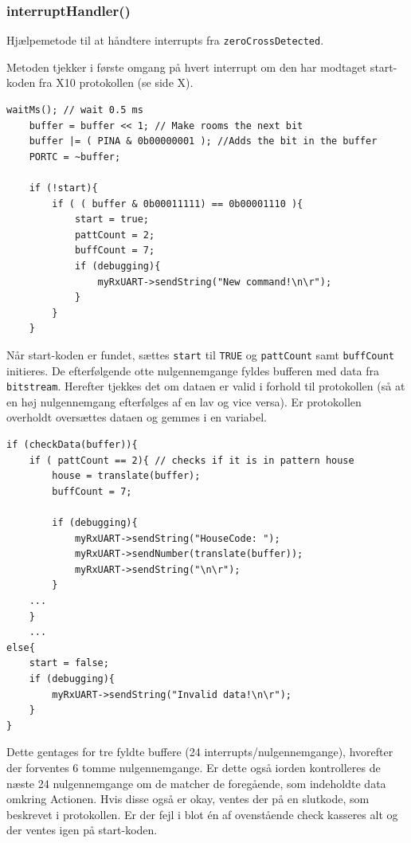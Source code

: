 \subsubsection{interruptHandler()}

Hjælpemetode til at håndtere interrupts fra \texttt{zeroCrossDetected}.

Metoden tjekker i første omgang på hvert interrupt om den har modtaget start-koden fra X10 protokollen (se side X). %

\begin{lstlisting}[caption=Der ventes 0.5 ms og der tjekkes efter startbit.]
	waitMs(); // wait 0.5 ms
	buffer = buffer << 1; // Make rooms the next bit
	buffer |= ( PINA & 0b00000001 ); //Adds the bit in the buffer
	PORTC = ~buffer;

	if (!start){
		if ( ( buffer & 0b00011111) == 0b00001110 ){
			start = true;
			pattCount = 2;
			buffCount = 7;
			if (debugging){
				myRxUART->sendString("New command!\n\r");
			}
		}
	}
\end{lstlisting}

Når start-koden er fundet, sættes \texttt{start} til \texttt{TRUE} og \texttt{pattCount} samt \texttt{buffCount} initieres. 
De efterfølgende otte nulgennemgange fyldes bufferen med data fra \texttt{bitstream}.
Herefter tjekkes det om dataen er valid i forhold til protokollen (så at en høj nulgennemgang efterfølges af en lav og vice versa).
Er protokollen overholdt oversættes dataen og gemmes i en variabel.

\begin{lstlisting}
if (checkData(buffer)){
	if ( pattCount == 2){ // checks if it is in pattern house
		house = translate(buffer);
		buffCount = 7;
			
		if (debugging){
			myRxUART->sendString("HouseCode: ");
			myRxUART->sendNumber(translate(buffer));
			myRxUART->sendString("\n\r");
		}
	...		
	}
	...
else{
	start = false;
	if (debugging){
		myRxUART->sendString("Invalid data!\n\r");	
	}	
}				
\end{lstlisting}

Dette gentages for tre fyldte buffere (24 interrupts/nulgennemgange), hvorefter der forventes 6 tomme nulgennemgange.
Er dette også iorden kontrolleres de næste 24 nulgennemgange om de matcher de foregående, som indeholdte data omkring Actionen.
Hvis disse også er okay, ventes der på en slutkode, som beskrevet i protokollen.
Er der fejl i blot én af ovenstående check kasseres alt og der ventes igen på start-koden.


